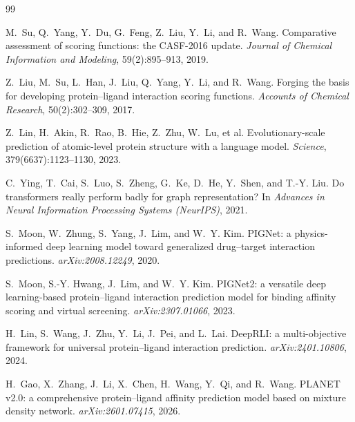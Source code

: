 \documentclass[11pt]{article}
\begin{document}
\begin{thebibliography}{99}

M.~Su, Q.~Yang, Y.~Du, G.~Feng, Z.~Liu, Y.~Li, and R.~Wang.
\newblock Comparative assessment of scoring functions: the CASF-2016 update.
\newblock \emph{Journal of Chemical Information and Modeling}, 59(2):895--913, 2019.

Z.~Liu, M.~Su, L.~Han, J.~Liu, Q.~Yang, Y.~Li, and R.~Wang.
\newblock Forging the basis for developing protein--ligand interaction scoring functions.
\newblock \emph{Accounts of Chemical Research}, 50(2):302--309, 2017.

Z.~Lin, H.~Akin, R.~Rao, B.~Hie, Z.~Zhu, W.~Lu, et al.
\newblock Evolutionary-scale prediction of atomic-level protein structure with a language
model.
\newblock \emph{Science}, 379(6637):1123--1130, 2023.

C.~Ying, T.~Cai, S.~Luo, S.~Zheng, G.~Ke, D.~He, Y.~Shen, and T.-Y. Liu.
\newblock Do transformers really perform badly for graph representation?
\newblock In \emph{Advances in Neural Information Processing Systems (NeurIPS)}, 2021.

S.~Moon, W.~Zhung, S.~Yang, J.~Lim, and W.~Y. Kim.
\newblock PIGNet: a physics-informed deep learning model toward generalized drug--target
interaction predictions.
\newblock \emph{arXiv:2008.12249}, 2020.

S.~Moon, S.-Y. Hwang, J.~Lim, and W.~Y. Kim.
\newblock PIGNet2: a versatile deep learning-based protein--ligand interaction prediction
model for binding affinity scoring and virtual screening.
\newblock \emph{arXiv:2307.01066}, 2023.

H.~Lin, S.~Wang, J.~Zhu, Y.~Li, J.~Pei, and L.~Lai.
\newblock DeepRLI: a multi-objective framework for universal protein--ligand interaction
prediction.
\newblock \emph{arXiv:2401.10806}, 2024.

H.~Gao, X.~Zhang, J.~Li, X.~Chen, H.~Wang, Y.~Qi, and R.~Wang.
\newblock PLANET v2.0: a comprehensive protein--ligand affinity prediction model based on
mixture density network.
\newblock \emph{arXiv:2601.07415}, 2026.

\end{thebibliography}
\end{document}
